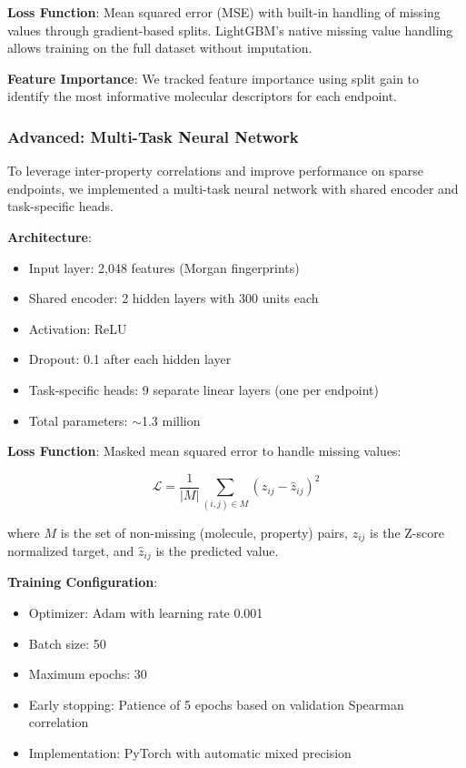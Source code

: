 \documentclass[11pt,a4paper]{article}
\begin{document}
\textbf{Loss Function}: Mean squared error (MSE) with built-in handling of missing values through gradient-based splits. LightGBM's native missing value handling allows training on the full dataset without imputation.

\textbf{Feature Importance}: We tracked feature importance using split gain to identify the most informative molecular descriptors for each endpoint.

\subsubsection{Advanced: Multi-Task Neural Network}

To leverage inter-property correlations and improve performance on sparse endpoints, we implemented a multi-task neural network with shared encoder and task-specific heads.

\textbf{Architecture}:
\begin{itemize}
    \item Input layer: 2,048 features (Morgan fingerprints)
    \item Shared encoder: 2 hidden layers with 300 units each
    \item Activation: ReLU
    \item Dropout: 0.1 after each hidden layer
    \item Task-specific heads: 9 separate linear layers (one per endpoint)
    \item Total parameters: $\sim$1.3 million
\end{itemize}

\textbf{Loss Function}: Masked mean squared error to handle missing values:

\begin{equation}
\mathcal{L} = \frac{1}{|M|} \sum_{(i,j) \in M} (z_{ij} - \hat{z}_{ij})^2
\end{equation}

where $M$ is the set of non-missing (molecule, property) pairs, $z_{ij}$ is the Z-score normalized target, and $\hat{z}_{ij}$ is the predicted value.

\textbf{Training Configuration}:
\begin{itemize}
    \item Optimizer: Adam with learning rate 0.001
    \item Batch size: 50
    \item Maximum epochs: 30
    \item Early stopping: Patience of 5 epochs based on validation Spearman correlation
    \item Implementation: PyTorch with automatic mixed precision
\end{itemize}
\end{document}
